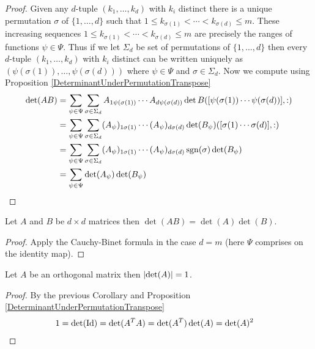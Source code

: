 \begin{proof}
Given any $d$-tuple $(k_1, \dotsc, k_d)$ with $k_i$ distinct there is a unique permutation $\sigma$ of $\lbrace 1 , \dotsc, d \rbrace$ such that $1 \leq k_{\sigma(1)} < \dotsb < k_{\sigma(d)} \leq m$. These increasing sequences $1 \leq k_{\sigma(1)} < \dotsb < k_{\sigma(d)} \leq m$ are precisely the ranges of functions $\psi \in \Psi$.   Thus if we let $\Sigma_d$ be set of permutations of $\lbrace 1, \dotsc, d \rbrace$ then every $d$-tuple $(k_1, \dotsc, k_d)$ with $k_i$ distinct can be written uniquely as $(\psi(\sigma(1)), \dotsc, \psi(\sigma(d)))$ where $\psi \in \Psi$ and $\sigma \in \Sigma_d$.  Now we compute using Proposition \ref{DeterminantUnderPermutationTranspose}
\begin{align*}
\det(AB) 
&= \sum_{\psi \in \Psi} \sum_{\sigma \in \Sigma_d} A_{1 \psi(\sigma(1))}  \dotsb A_{d \psi(\sigma(d))} \det B([\psi(\sigma(1)) \dotsb \psi(\sigma(d)) ], :) \\
&= \sum_{\psi \in \Psi} \sum_{\sigma \in \Sigma_d} (A_\psi)_{1 \sigma(1)}  \dotsb (A_\psi)_{d \sigma(d)} \det (B_\psi) ([\sigma(1) \dotsb \sigma(d) ], :) \\
&= \sum_{\psi \in \Psi} \sum_{\sigma \in \Sigma_d} (A_\psi)_{1 \sigma(1)}  \dotsb (A_\psi)_{d \sigma(d)} \operatorname*{sgn}(\sigma) \det (B_\psi) \\
&= \sum_{\psi \in \Psi} \det(A_\psi) \det(B_\psi)
\end{align*}
\end{proof}

\begin{cor}\label{DeterminantOfProducts}Let $A$ and $B$ be $d \times d$ matrices then $\det(AB) = \det(A) \det(B)$.
\end{cor}
\begin{proof}
Apply the Cauchy-Binet formula in the case $d=m$ (here $\Psi$ comprises on the identity map).
\end{proof}

\begin{cor}Let $A$ be an orthogonal matrix then $\left \vert \det(A) \right \vert = 1$.
\end{cor}
\begin{proof}
By the previous Corollary and  Proposition \ref{DeterminantUnderPermutationTranspose}
\begin{align*}
1 &= \det(\operatorname*{Id}) = \det(A^T A) = \det(A^T) \det(A) = \det(A)^2
\end{align*}
\end{proof}
